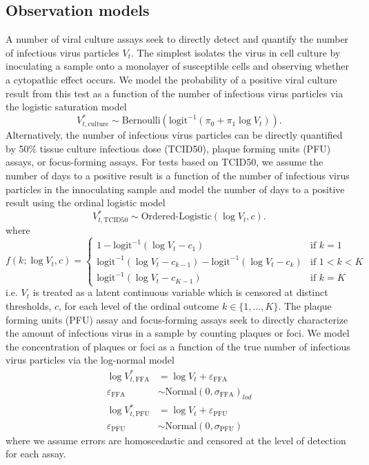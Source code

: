 \documentclass[12pt]{article}
\begin{document}
\subsection{Observation models}
A number of viral culture assays seek to directly detect and quantify the number of infectious virus particles $V_t$. The simplest isolates the virus in cell culture by inoculating a sample onto a monolayer of susceptible cells and observing whether a cytopathic effect occurs. We model the probability of a positive viral culture result from this test as a function of the number of infectious virus particles via the logistic saturation model
\begin{equation*}
    V^{*}_{t,\text{culture}} \sim \text{Bernoulli}(\text{logit}^{-1}(\pi_0 + \pi_1 \log V_t)).
\end{equation*}
Alternatively, the number of infectious virus particles can be directly quantified by 50\% tissue culture infectious dose (TCID50), plaque forming units (PFU) assays, or focus-forming assays. For tests based on TCID50, we assume the number of days to a positive result is a function of the number of infectious virus particles in the innoculating sample and model the number of days to a positive result using the ordinal logistic model
\begin{equation*}
    V^{*}_{t,\text{TCID50}} \sim \text{Ordered-Logistic}(\log V_t, c).
\end{equation*}
where 
\begin{equation*}
    f(k; \log V_t, c) = 
    \begin{cases}
        1 - \text{logit}^{-1}(\log V_t - c_1) & \text{if } k = 1 \\
        \text{logit}^{-1}(\log V_t - c_{k-1}) - \text{logit}^{-1}(\log V_t - c_k) & \text{if } 1 < k < K \\
        \text{logit}^{-1}(\log V_t - c_{K-1}) & \text{if } k = K
    \end{cases}
\end{equation*}
i.e. $V_t$ is treated as a latent continuous variable which is censored at distinct thresholds, $c$, for each level of the ordinal outcome $k \in \{1, \ldots, K\}$. The plaque forming units (PFU) assay and focus-forming assays seek to directly characterize the amount of infectious virus in a sample by counting plaques or foci. We model the concentration of plaques or foci as a function of the true number of infectious virus particles via the log-normal model
\begin{align*}
    \log V^{*}_{t,\text{FFA}} &= \log V_t + \varepsilon_{\text{FFA}} \\
    \varepsilon_{\text{FFA}} &\sim \text{Normal}(0, \sigma_{\text{FFA}})_{lod} \\
    \log V^{*}_{t,\text{PFU}} &= \log V_t + \varepsilon_{\text{PFU}} \\
    \varepsilon_{\text{PFU}} &\sim \text{Normal}(0, \sigma_{\text{PFU}})
\end{align*}
where we assume errors are homoscedastic and censored at the level of detection for each assay. 
\end{document}
